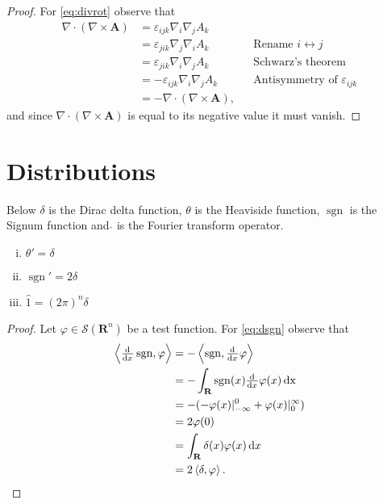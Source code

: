 \documentclass[a4paper, 11pt]{scrartcl}
\renewcommand{\vec}[1]{\bm{#1}}
\begin{document}
\begin{proof}
  For \eqref{eq:divrot} observe that
  \begin{align*}
    \nabla\cdot(\nabla\times\vec{A})
    &= \varepsilon_{ijk} \nabla_i \nabla_j A_k \\
    &= \varepsilon_{jik} \nabla_j \nabla_i A_k
    && \text{Rename $i \leftrightarrow j$} \\
    &= \varepsilon_{jik} \nabla_i \nabla_j A_k
    && \text{Schwarz's theorem} \\
    &= -\varepsilon_{ijk} \nabla_i \nabla_j A_k
    && \text{Antisymmetry of $\varepsilon_{ijk}$} \\
    &= -\nabla\cdot(\nabla\times\vec{A}),
  \end{align*}
  and since $\nabla\cdot(\nabla\times\vec{A})$ is equal to its negative value it must vanish.
\end{proof}

\section*{Distributions}
Below $\delta$ is the Dirac delta function, $\theta$ is the Heaviside function, $\operatorname{sgn}$ is the Signum function and $\hat{}$ is the Fourier transform operator.
\begin{enumerate}[(i)]
  \item $\theta' = \delta$
  \item $\operatorname{sgn}' = 2\delta\label{eq:dsgn}$
  \item $\hat{1} = (2\pi)^n\delta$
\end{enumerate}

\begin{proof}
  Let $\varphi \in \mathcal{S}(\mathbf{R}^n)$ be a test function.
  For \eqref{eq:dsgn} observe that
  \begin{align*}
    \left<\od{}{x}\operatorname{sgn},\varphi\right> &= -\left<\operatorname{sgn},\od{}{x}\varphi\right> \\
    &=  -\int_{\mathbf{R}}\operatorname{sgn}(x)\od{}{x}\varphi(x)\operatorname{dx} \\
    &= -(-\varphi(x)\rvert_{-\infty}^0+\varphi(x)\rvert_{0}^\infty) \\
    &= 2\varphi(0) \\
    &= \int_{\mathbf{R}}\delta(x)\varphi(x)\dif x\\
    &= 2\left<\delta,\varphi\right>.\qedhere
  \end{align*}
\end{proof}
\end{document}

